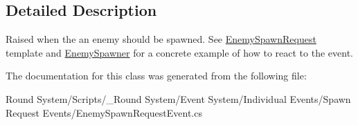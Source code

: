 \subsection{Detailed Description}
Raised when the an enemy should be spawned. See \hyperlink{class_round_manager_1_1_enemy_spawn_request}{Enemy\+Spawn\+Request} template and \hyperlink{class_round_manager_1_1_enemy_spawner}{Enemy\+Spawner} for a concrete example of how to react to the event. 



The documentation for this class was generated from the following file\+:\begin{DoxyCompactItemize}
\item 
Round System/\+Scripts/\+\_\+\+Round System/\+Event System/\+Individual Events/\+Spawn Request Events/Enemy\+Spawn\+Request\+Event.\+cs\end{DoxyCompactItemize}
